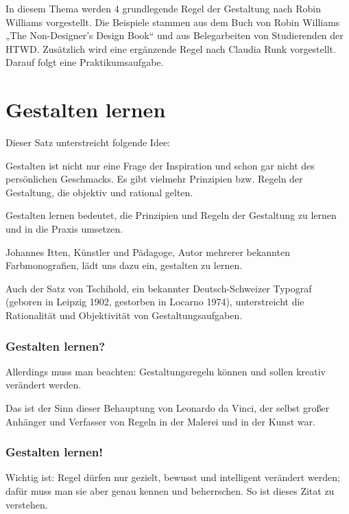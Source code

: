 In diesem Thema werden 4 grundlegende Regel der Gestaltung nach Robin Williams vorgestellt. Die Beispiele stammen aus dem Buch von Robin Williams „The Non-Designer's Design Book“ und aus Belegarbeiten von Studierenden der HTWD. Zusätzlich wird eine ergänzende Regel nach Claudia Runk vorgestellt.
Darauf folgt eine Praktikumsaufgabe.

\section{Gestalten lernen}
Dieser Satz unterstreicht folgende Idee:\bigskip

Gestalten ist nicht nur eine Frage der Inspiration und schon gar nicht des persönlichen Geschmacks. Es gibt vielmehr Prinzipien bzw. Regeln der Gestaltung, die objektiv und rational gelten.

Gestalten lernen bedeutet, die Prinzipien und Regeln der Gestaltung zu lernen und in die Praxis umsetzen.

Johannes Itten, Künstler und Pädagoge, Autor mehrerer bekannten Farbmonografien, lädt uns dazu ein, gestalten zu lernen.

Auch der Satz von Tschihold, ein bekannter Deutsch-Schweizer Typograf (geboren in Leipzig 1902, gestorben in Locarno 1974), unterstreicht die Rationalität und Objektivität von Gestaltungsaufgaben.

\subsubsection*{Gestalten lernen?}
Allerdings muss man beachten: Gestaltungsregeln können und sollen kreativ verändert werden.\bigskip

Das ist der Sinn dieser Behauptung von Leonardo da Vinci, der selbst großer Anhänger und Verfasser von Regeln in der Malerei und in der Kunst war.

\subsubsection*{Gestalten lernen!}
Wichtig ist: Regel dürfen nur gezielt, bewusst und intelligent verändert werden; dafür muss man sie aber genau kennen und beherrschen. So ist dieses Zitat zu verstehen.

